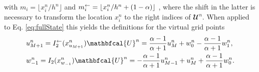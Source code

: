 with $m_i = \lfloor x_i^n/h^n\rfloor$ and $m_i^\leftarrow = \lfloor x_i^n/ h^n+(1-\alpha) \rfloor$ , where the shift in the latter is necessary to transform the location $x_i^n$ to the right indices of $\mathbfcal{U}^n$.
When applied to Eq. \eqref{eq:fullState} this yields the definitions for the virtual grid points
\begin{subequations}\label{eq:connectionInterpol}
\begin{align}
        &u_{M+1}^n = I_2^\flip(x^n_{u_{M+1}})\mathbfcal{U}^n = \frac{\alpha - 1}{\alpha + 1}u_{M}^n + w_0^n - \frac{\alpha - 1}{\alpha + 1}w_1^n,
    \label{eq:calcUMP1}\\
        &w_{-1}^n = I_2(x^n_{w_{-1}})\mathbfcal{U}^n
        =-\frac{\alpha - 1}{\alpha + 1}u_{M-1}^n + u_{M}^n+ \frac{\alpha - 1}{\alpha + 1}w_{0}^n.\label{eq:calcWM1}
\end{align}
\end{subequations}
